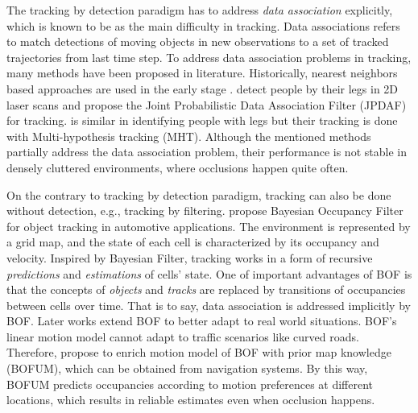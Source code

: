 The tracking by detection paradigm has to address \textit{data association} explicitly, which is known to be as the main difficulty in tracking. Data associations refers to match detections of moving objects in new observations to a set of tracked trajectories from last time step. To address data association problems in tracking, many methods have been proposed in literature. Historically, nearest neighbors based approaches are used in the early stage \citep{fod2002laser}. \citet{schulz2001tracking} detect people by their legs in 2D laser scans and propose the Joint Probabilistic Data Association Filter (JPDAF) for tracking. \citet{arras2008efficient} is similar in identifying people with legs but their tracking is done with Multi-hypothesis tracking (MHT). Although the mentioned methods partially address the data association problem, their performance is not stable in densely cluttered environments, where occlusions happen quite often.

On the contrary to tracking by detection paradigm, tracking can also be done without detection, e.g., tracking by filtering. \citet{coue2006bayesian} propose Bayesian Occupancy Filter for object tracking in automotive applications. The environment is represented by a grid map, and the state of each cell is characterized by its occupancy and velocity. Inspired by Bayesian Filter, tracking works in a form of recursive \textit{predictions} and \textit{estimations} of cells' state. One of important advantages of BOF is that the concepts of \textit{objects} and \textit{tracks} are replaced by transitions of occupancies between cells over time. That is to say, data association is addressed implicitly by BOF. Later works extend BOF to better adapt to real world situations. BOF's linear motion model cannot adapt to traffic scenarios like curved roads. Therefore, \citet{gindele2009bayesian} propose to enrich motion model of BOF with prior map knowledge (BOFUM), which can be obtained from navigation systems. By this way, BOFUM predicts occupancies according to motion preferences at different locations, which results in reliable estimates even when occlusion happens. 

